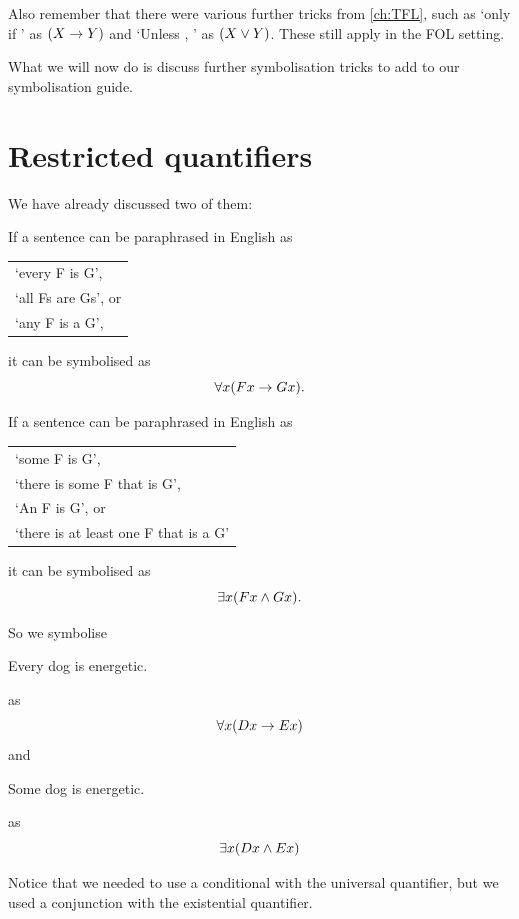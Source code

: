 	Also remember that there were various further tricks from \ref{ch:TFL}, such as `\metaX only if \metaY' as $(X\rightarrow Y)$ and `Unless \metaX, \metaY' as $(X\vee Y)$. These still apply in the FOL setting. 
	
	What we will now do is discuss further symbolisation tricks to add to our symbolisation guide. 
	
	\section{Restricted quantifiers}
	We have already discussed two of them: 
	
		\begin{highlighted}
		If a sentence can be paraphrased in English as \begin{center}
			\begin{tabular}{l}`every F is G',\\`all Fs are Gs', or\\ `any F is a G',
			\end{tabular}
		\end{center} it can be symbolised as $$\forall x (Fx \rightarrow Gx).$$
		
		If a sentence can be paraphrased in English as \begin{center}
			\begin{tabular}{l}`some F is G',\\`there is some F that is G', \\`An F is G', or \\`there is at least one F that is a G'
			\end{tabular}
		\end{center} it can be symbolised as $$\exists x (Fx \mathbin{\wedge} Gx).$$
		\end{highlighted}
	
	So we symbolise 
		\begin{samplesent}
		\item Every dog is energetic. 
	\end{samplesent}
	as $$\forall x(Dx\rightarrow Ex)$$
	and 
		\begin{samplesent}
		\item Some dog is energetic. 
	\end{samplesent}
	as $$\exists x(Dx\mathbin{\wedge} Ex)$$
	
		Notice that we needed to use a conditional with the universal quantifier, but we used a conjunction with the existential quantifier. 
		
